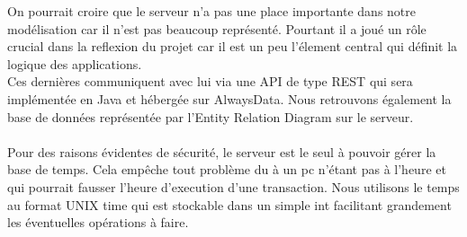\documentclass[../rapport.tex]{subfiles}
\begin{document}
On pourrait croire que le serveur n'a pas une place importante dans notre modélisation car il n'est pas beaucoup représenté.
Pourtant il a joué un rôle crucial dans la reflexion du projet car il est un peu l'élement central qui définit la logique des applications. \\
Ces dernières communiquent avec lui via une API de type REST qui sera implémentée en Java et hébergée sur AlwaysData. 
Nous retrouvons également la base de données représentée par l'Entity Relation Diagram sur le serveur. \\
\\
Pour des raisons évidentes de sécurité, le serveur est le seul à pouvoir gérer la base de temps. Cela empêche tout problème du à un pc n'étant pas à l'heure et qui pourrait fausser l'heure d'execution d'une transaction.
Nous utilisons le temps au format UNIX time qui est stockable dans un simple int facilitant grandement les éventuelles opérations à faire.
\end{document}
